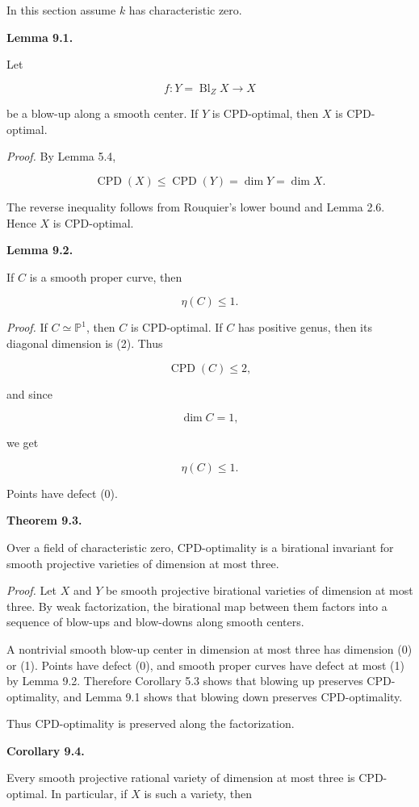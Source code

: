 \documentclass[11pt]{amsart}
\theoremstyle{definition}
\begin{document}
In this section assume $k$ has characteristic zero.

\noindent\textbf{Lemma 9.1.}

Let

\[
f:Y=\operatorname{Bl}_ZX\to X
\]

be a blow-up along a smooth center. If $Y$ is CPD-optimal, then $X$ is CPD-optimal.

\noindent\emph{Proof.} By Lemma 5.4,

\[
\operatorname{CPD}(X)\le \operatorname{CPD}(Y)=\dim Y=\dim X.
\]

The reverse inequality follows from Rouquier's lower bound and Lemma 2.6. Hence $X$ is CPD-optimal.

\noindent\textbf{Lemma 9.2.}

If $C$ is a smooth proper curve, then

\[
\eta(C)\le1.
\]

\noindent\emph{Proof.} If $C\simeq\mathbb P^1$, then $C$ is CPD-optimal. If $C$ has positive genus, then its diagonal dimension is (2). Thus

\[
\operatorname{CPD}(C)\le2,
\]

and since

\[
\dim C=1,
\]

we get

\[
\eta(C)\le1.
\]

Points have defect (0).

\noindent\textbf{Theorem 9.3.}

Over a field of characteristic zero, CPD-optimality is a birational invariant for smooth projective varieties of dimension at most three.

\noindent\emph{Proof.} Let $X$ and $Y$ be smooth projective birational varieties of dimension at most three. By weak factorization, the birational map between them factors into a sequence of blow-ups and blow-downs along smooth centers.

A nontrivial smooth blow-up center in dimension at most three has dimension (0) or (1). Points have defect (0), and smooth proper curves have defect at most (1) by Lemma 9.2. Therefore Corollary 5.3 shows that blowing up preserves CPD-optimality, and Lemma 9.1 shows that blowing down preserves CPD-optimality.

Thus CPD-optimality is preserved along the factorization.

\noindent\textbf{Corollary 9.4.}

Every smooth projective rational variety of dimension at most three is CPD-optimal. In particular, if $X$ is such a variety, then
\end{document}
